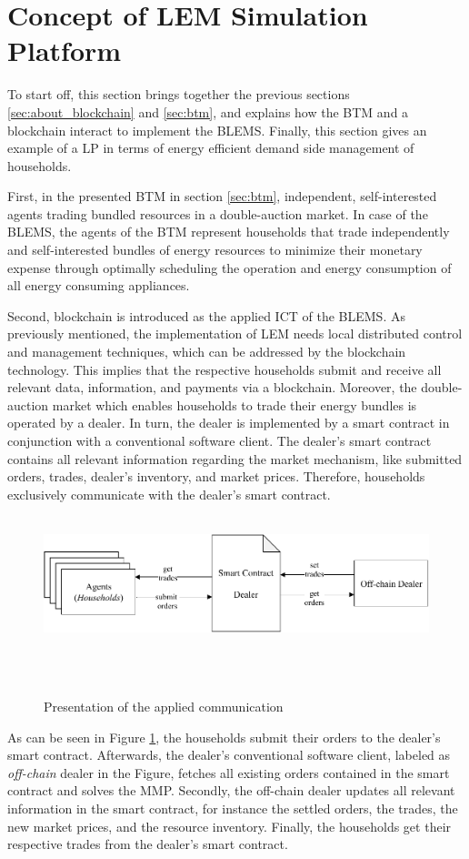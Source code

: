 \section{Concept of LEM Simulation Platform}
\label{sec:concept_of_lem}
To start off, this section brings together the previous sections \ref{sec:about_blockchain} and \ref{sec:btm},
and explains how the BTM and a blockchain interact to implement the BLEMS.
Finally, this section gives an example of a LP in terms of energy efficient demand side management of households. 

First, in the presented BTM in section \ref{sec:btm}, independent, self-interested agents trading bundled resources
in a double-auction market. 
In case of the BLEMS, the agents of the BTM represent households that 
trade independently and self-interested bundles of energy resources to minimize their monetary expense 
through optimally scheduling the operation and energy consumption 
of all energy consuming appliances.

Second, blockchain is introduced as the applied ICT of the BLEMS. 
As previously mentioned, the implementation of LEM needs local distributed control and 
management techniques, which can be addressed by the blockchain technology.
This implies that the respective households submit and receive all relevant data, information, and payments via a blockchain. 
Moreover, the double-auction market which enables households to trade their energy bundles is operated by a dealer.
In turn, the dealer is implemented by a smart contract in conjunction with a conventional software client. 
The dealer's smart contract contains all relevant information regarding the market mechanism, like submitted orders, trades, 
dealer's inventory, and market prices. 
Therefore, households exclusively communicate with the dealer's smart contract. 

\begin{figure}[htbp]
    \centering
    \includegraphics[width=.85\linewidth]{./figures/concept_lem.pdf}
    \caption{Presentation of the applied communication}
    \label{figure:concept_lem}
\end{figure}

As can be seen in Figure \ref{figure:concept_lem}, the households submit their orders to the dealer's smart contract. 
Afterwards, the dealer's conventional software client, labeled as \textit{off-chain} dealer in the Figure, fetches all existing orders contained in the smart contract
and solves the MMP.
Secondly, the off-chain dealer updates all relevant information in the smart contract, for instance 
the settled orders, the trades, the new market prices, and the resource inventory.
Finally, the households get their respective trades from the dealer's smart contract. 

